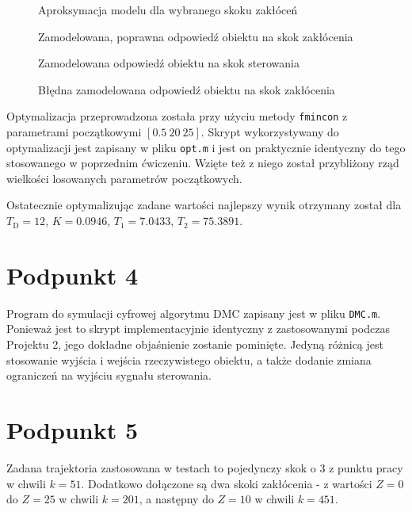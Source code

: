 \begin{figure}[ht]
\centering

\caption{Aproksymacja modelu dla wybranego skoku zakłóceń}
\label{R3}
\end{figure}

\begin{figure}[ht]
\centering

\caption{Zamodelowana, poprawna odpowiedź obiektu na skok zakłócenia}
\label{R4}
\end{figure}

\begin{figure}[ht]
\centering

\caption{Zamodelowana odpowiedź obiektu na skok sterowania}
\label{R5}
\end{figure}

\begin{figure}[ht]
\centering

\caption{Błędna zamodelowana odpowiedź obiektu na skok zakłócenia}
\label{R6}
\end{figure}

Optymalizacja przeprowadzona została przy użyciu metody \verb+fmincon+ z parametrami początkowymi $[\num{0,5} ~ 20 ~ 25]$. Skrypt wykorzystywany do optymalizacji jest zapisany w pliku \verb|opt.m| i jest on praktycznie identyczny do tego stosowanego w poprzednim ćwiczeniu. Wzięte też z niego został przybliżony rząd wielkości losowanych parametrów początkowych.

Ostatecznie optymalizując zadane wartości najlepszy wynik otrzymany został dla $T_{\mathrm{D}}=12$, $K=\num{0.0946}$, $T_1=\num{7.0433}$, $T_2=\num{75.3891}$.

\chapter{Podpunkt 4}
Program do symulacji cyfrowej algorytmu DMC zapisany jest w pliku \verb+DMC.m+. Ponieważ jest to skrypt implementacyjnie identyczny z zastosowanymi podczas Projektu 2, jego dokładne objaśnienie zostanie pominięte. Jedyną różnicą jest stosowanie wyjścia i wejścia rzeczywistego obiektu, a także dodanie zmiana ograniczeń na wyjściu sygnału sterowania.

\chapter{Podpunkt 5}
Zadana trajektoria zastosowana w testach to pojedynczy skok o \num{3} z punktu pracy w chwili $ k = 51 $. Dodatkowo dołączone są dwa skoki zakłócenia - z wartości $ Z = 0 $ do $ Z = 25 $ w chwili $ k = 201 $, a następny do $ Z = 10 $ w chwili $ k = 451 $.


